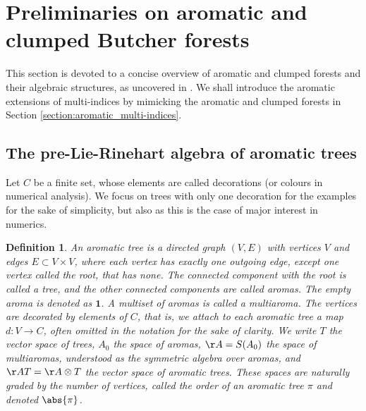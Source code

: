 \documentclass[a4paper,11pt]{article}
\newtheorem{definition}[theorem]{Definition}
\begin{document}
\section{Preliminaries on aromatic and clumped Butcher forests}
\label{section:AF}

This section is devoted to a concise overview of aromatic and clumped forests and their algebraic structures, as uncovered in \cite{Floystad20tup, Bogfjellmo19aso, Bronasco22cef}.
We shall introduce the aromatic extensions of multi-indices by mimicking the aromatic and clumped forests in Section \ref{section:aromatic_multi-indices}.





\subsection{The pre-Lie-Rinehart algebra of aromatic trees}


Let $C$ be a finite set, whose elements are called decorations (or colours in numerical analysis). We focus on trees with only one decoration for the examples for the sake of simplicity, but also as this is the case of major interest in numerics.
\begin{definition}
An aromatic tree is a directed graph $(V,E)$ with vertices $V$ and edges $E\subset V\times V$, where each vertex has exactly one outgoing edge, except one vertex called the root, that has none. The connected component with the root is called a tree, and the other connected components are called aromas. The empty aroma is denoted as $\mathbf{1}$. A multiset of aromas is called a multiaroma.
The vertices are decorated by elements of $C$, that is, we attach to each aromatic tree a map $d\colon V\rightarrow C$, often omitted in the notation for the sake of clarity.
We write $T$ the vector space of trees, $A_0$ the space of aromas, $\AA=S(A_0)$ the space of multiaromas, understood as the symmetric algebra over aromas, and $\AA T=\AA\otimes T$ the vector space of aromatic trees.
These spaces are naturally graded by the number of vertices, called the order of an aromatic tree $\pi$ and denoted $\abs{\pi}$.
\end{definition}
\end{document}
